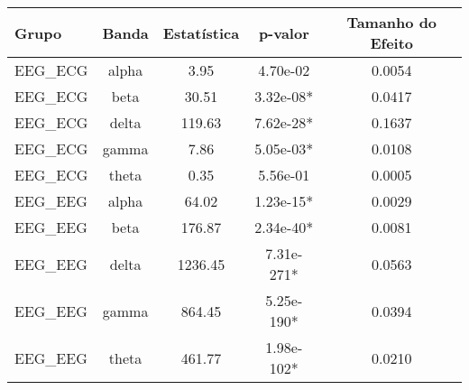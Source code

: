 \begin{tabular}{lcccc}
\toprule
Grupo & Banda & Estatística & p-valor & Tamanho do Efeito \\
\midrule
EEG\_ECG & alpha & 3.95 & 4.70e-02 & 0.0054 \\
EEG\_ECG & beta & 30.51 & 3.32e-08* & 0.0417 \\
EEG\_ECG & delta & 119.63 & 7.62e-28* & 0.1637 \\
EEG\_ECG & gamma & 7.86 & 5.05e-03* & 0.0108 \\
EEG\_ECG & theta & 0.35 & 5.56e-01 & 0.0005 \\
EEG\_EEG & alpha & 64.02 & 1.23e-15* & 0.0029 \\
EEG\_EEG & beta & 176.87 & 2.34e-40* & 0.0081 \\
EEG\_EEG & delta & 1236.45 & 7.31e-271* & 0.0563 \\
EEG\_EEG & gamma & 864.45 & 5.25e-190* & 0.0394 \\
EEG\_EEG & theta & 461.77 & 1.98e-102* & 0.0210 \\
\bottomrule
\end{tabular}